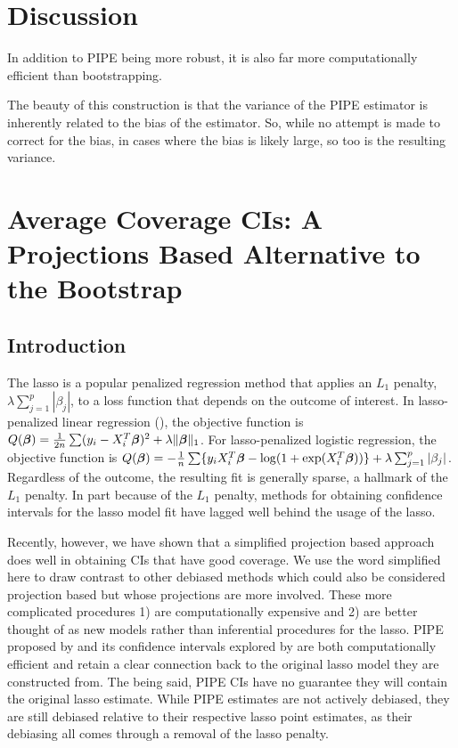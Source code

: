 \section{Discussion}

In addition to PIPE being more robust, it is also far more computationally efficient than bootstrapping. 

The beauty of this construction is that the variance of the PIPE estimator is inherently related to the bias of the estimator. So, while no attempt is made to correct for the bias, in cases where the bias is likely large, so too is the resulting variance.

\newpage
\section{Average Coverage CIs: A Projections Based Alternative to the Bootstrap}

\subsection{Introduction}

The lasso is a popular penalized regression method that applies an $L_1$ penalty, $\lambda \sum_{j = 1}^p |\beta_j|$, to a loss function that depends on the outcome of interest. In lasso-penalized linear regression (\cite{Tibshirani1996}), the objective function is $Q(\boldsymbol{\beta}) = \frac{1}{2n} \sum ( y_i - X_i^T \boldsymbol{\beta} )^2 + \lambda\lVert\boldsymbol{\beta}\rVert_1$. For lasso-penalized logistic regression, the objective function is $Q(\boldsymbol{\beta}) = -\frac{1}{n} \sum\lbrace y_i X_i^T\boldsymbol{\beta} - \log(1+\exp(X_i^T \boldsymbol{\beta})) \rbrace + \lambda \sum_{j = 1}^p |\beta_j|$. Regardless of the outcome, the resulting fit is generally sparse, a hallmark of the $L_1$ penalty. In part because of the $L_1$ penalty, methods for obtaining confidence intervals for the lasso model fit have lagged well behind the usage of the lasso. 

Recently, however, we have shown that a simplified projection based approach does well in obtaining CIs that have good coverage. We use the word simplified here to draw contrast to other debiased methods which could also be considered projection based but whose projections are more involved. These more complicated procedures 1) are computationally expensive and 2) are better thought of as new models rather than inferential procedures for the lasso. PIPE proposed by  and its confidence intervals explored by  are both computationally efficient and retain a clear connection back to the original lasso model they are constructed from. The being said, PIPE CIs have no guarantee they will contain the original lasso estimate. While PIPE estimates are not actively debiased, they are still debiased relative to their respective lasso point estimates, as their debiasing all comes through a removal of the lasso penalty. 

